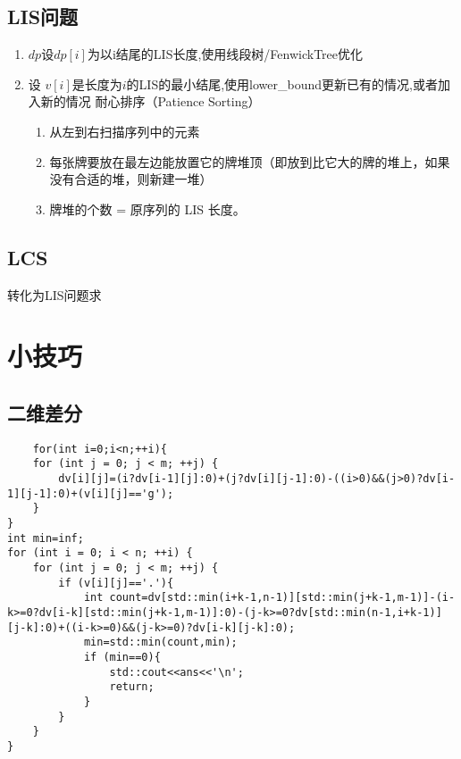 \documentclass[UTF8]{ctexart}
\begin{document}
\subsection{LIS问题}
\begin{enumerate}
    \item $dp$设$dp[i]$为以i结尾的LIS长度,使用线段树/FenwickTree优化
    \item 设 $v[i]$是长度为$i$的LIS的最小结尾,使用lower\_bound更新已有的情况,或者加入新的情况
    耐心排序（Patience Sorting）
    \begin{enumerate}
        \item 从左到右扫描序列中的元素
        \item 每张牌要放在最左边能放置它的牌堆顶（即放到比它大的牌的堆上，如果没有合适的堆，则新建一堆）
        \item 牌堆的个数 = 原序列的 LIS 长度。
    \end{enumerate}
\end{enumerate}
\subsection{LCS}
转化为LIS问题求
\section{小技巧}
\subsection{二维差分}
\begin{lstlisting}
    for(int i=0;i<n;++i){
    for (int j = 0; j < m; ++j) {
        dv[i][j]=(i?dv[i-1][j]:0)+(j?dv[i][j-1]:0)-((i>0)&&(j>0)?dv[i-1][j-1]:0)+(v[i][j]=='g');
    }
}
int min=inf;
for (int i = 0; i < n; ++i) {
    for (int j = 0; j < m; ++j) {
        if (v[i][j]=='.'){
            int count=dv[std::min(i+k-1,n-1)][std::min(j+k-1,m-1)]-(i-k>=0?dv[i-k][std::min(j+k-1,m-1)]:0)-(j-k>=0?dv[std::min(n-1,i+k-1)][j-k]:0)+((i-k>=0)&&(j-k>=0)?dv[i-k][j-k]:0);
            min=std::min(count,min);
            if (min==0){
                std::cout<<ans<<'\n';
                return;
            }
        }
    }
}
\end{lstlisting}
\end{document}
